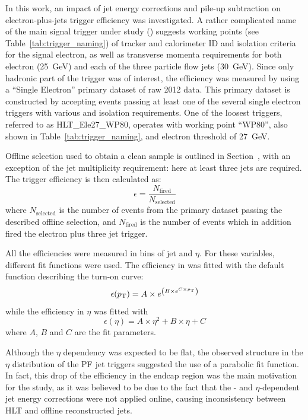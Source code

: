 In this work, an impact of jet energy corrections and pile-up subtraction on electron-plus-jets trigger efficiency was
investigated. A rather complicated name of the main signal trigger under study (\HLTThreeCentralPFJet) suggests working
points (see Table~\ref{tab:trigger_naming}) of tracker and calorimeter ID and isolation criteria for the signal
electron, as well as transverse momenta requirements for both electron (\SI{25}{\GeV}) and each of the three particle
flow jets (\SI{30}{\GeV}). Since only hadronic part of the trigger was of interest, the efficiency was measured by using
a ``Single Electron'' primary dataset of raw 2012 data. This primary dataset is constructed by accepting events passing
at least one of the several single electron triggers with various \pt and isolation requirements. One of the loosest
triggers, referred to as HLT\_Ele27\_WP80, operates with working point ``WP80'', also shown in
Table~\ref{tab:trigger_naming}, and electron \pt threshold of \SI{27}{\GeV}.

Offline selection used to obtain a clean \ttbar sample is outlined in Section~\cite{ss:event_selection}, with an
exception of the jet multiplicity requirement: here at least three jets are required. The trigger efficiency is then
calculated as:
\begin{equation}
\epsilon = \frac{N_{\text{fired}}}{N_{\text{selected}}}
\end{equation}
where $N_{\text{selected}}$ is the number of events from the primary dataset passing the described offline selection,
and $N_{\text{fired}}$ is the number of events which in addition fired the electron plus three jet trigger.

All the efficiencies were measured in bins of jet \pt and $\eta$. For these variables, different fit functions were
used. The efficiency in \pt was fitted with the default function describing the turn-on curve:
\begin{equation}
\epsilon(p_{\mathrm{T}}) = A \times e^{\left(B \times e^{C \times p_{\mathrm{T}}}\right)}
\end{equation}
while the efficiency in $\eta$ was fitted with
\begin{equation}
\epsilon (\eta) = A \times \eta^2 + B \times \eta + C
\end{equation}
where $A$, $B$ and $C$ are the fit parameters.

Although the $\eta$ dependency was expected to be flat, the observed structure in the $\eta$ distribution of the PF jet
triggers suggested the use of a parabolic fit function. In fact, this drop of the efficiency in the endcap region was
the main motivation for the study, as it was believed to be due to the fact that the \pt- and $\eta$-dependent jet
energy corrections were not applied online, causing inconsistency between HLT and offline reconstructed jets.

